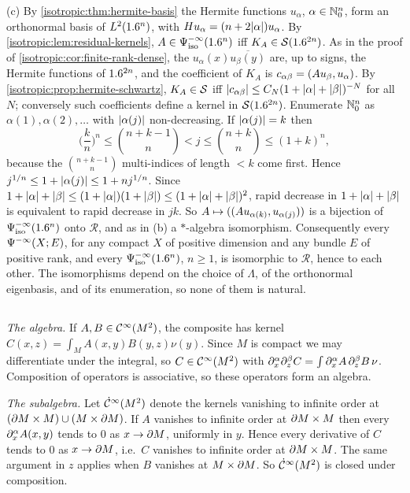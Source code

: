 (c) By \cref{isotropic:thm:hermite-basis} the Hermite functions $u_\alpha$, $\alpha\in\mathbb{N}_0^n$, form an
orthonormal basis of $L^2(1.6^n)$, with $Hu_\alpha=(n+2\lvert \alpha\rvert)u_\alpha$. By
\cref{isotropic:lem:residual-kernels}, $A\in\Psi^{-\infty}_{\mathrm{iso}}(1.6^n)$ iff $K_A\in\mathcal{S}(1.6^{2n})$. As in
the proof of \cref{isotropic:cor:finite-rank-dense}, the $u_\alpha(x)\overline{u_\beta(y)}$ are, up to
signs, the Hermite functions of $1.6^{2n}$, and the coefficient of $K_A$ is
$c_{\alpha\beta}=( Au_\beta, u_\alpha)$. By \cref{isotropic:prop:hermite-schwartz}, $K_A\in\mathcal{S}$ iff
$\lvert c_{\alpha\beta}\rvert\le C_N(1+\lvert \alpha\rvert+\lvert \beta\rvert)^{-N}$ for all $N$; conversely such coefficients define
a kernel in $\mathcal{S}(1.6^{2n})$. Enumerate $\mathbb{N}_0^n$ as $\alpha(1),\alpha(2),\dots$ with $\lvert \alpha(j)\rvert$
non-decreasing. If $\lvert \alpha(j)\rvert=k$ then
\begin{equation*}
\Big(\frac kn\Big)^n\le\binom{n+k-1}n<j\le\binom{n+k}n\le(1+k)^n ,
\end{equation*}
because the $\binom{n+k-1}n$ multi-indices of length $<k$ come first. Hence
$j^{1/n}\le1+\lvert \alpha(j)\rvert\le1+nj^{1/n}$. Since
$1+\lvert \alpha\rvert+\lvert \beta\rvert\le(1+\lvert \alpha\rvert)(1+\lvert \beta\rvert)\le(1+\lvert \alpha\rvert+\lvert \beta\rvert)^2$, rapid decrease in
$1+\lvert \alpha\rvert+\lvert \beta\rvert$ is equivalent to rapid decrease in $jk$. So $A\mapsto(( Au_{\alpha(k)}, u_{\alpha(j)}))$ is a
bijection of $\Psi^{-\infty}_{\mathrm{iso}}(1.6^n)$ onto $\mathcal R$, and as in (b) a $*$-algebra
isomorphism. Consequently every $\Psi^{-\infty}(X;E)$, for any compact $X$ of positive
dimension and any bundle $E$ of positive rank, and every $\Psi^{-\infty}_{\mathrm{iso}}(1.6^n)$, $n\ge1$, is isomorphic to
$\mathcal R$, hence to each other. The isomorphisms depend on the choice of $\Lambda$, of the
orthonormal eigenbasis, and of its enumeration, so none of them is natural.

\subsection*{}
\emph{The algebra.} If $A,B\in\mathcal{C}^\infty(M^2)$, the composite has kernel
$C(x,z)=\int_MA(x,y)B(y,z)\nu(y)$. Since $M$ is compact we may differentiate under the
integral, so $C\in\mathcal{C}^\infty(M^2)$ with $\partial^\alpha_x\partial^\beta_zC=\int\partial^\alpha_xA\,\partial^\beta_zB\,\nu$. Composition of
operators is associative, so these operators form an algebra.

\emph{The subalgebra.} Let $\dot{\mathcal{C}}^\infty(M^2)$ denote the kernels vanishing to infinite order at
$(\partial M\times M)\cup(M\times\partial M)$. If $A$ vanishes to infinite order at $\partial M\times M$ then every
$\partial_x^\alpha A(x,y)$ tends to $0$ as $x\to\partial M$, uniformly in $y$. Hence every derivative of $C$ tends
to $0$ as $x\to\partial M$, i.e.\ $C$ vanishes to infinite order at $\partial M\times M$. The same argument
in $z$ applies when $B$ vanishes at $M\times\partial M$. So $\dot{\mathcal{C}}^\infty(M^2)$ is closed under
composition.

